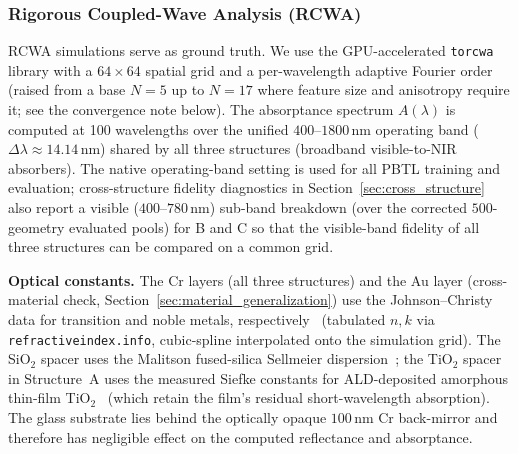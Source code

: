 \documentclass[a4paper,fleqn]{cas-sc}
\begin{document}
\subsubsection{Rigorous Coupled-Wave Analysis (RCWA)}
\label{sec:rcwa_methods}

RCWA simulations serve as ground truth. We use the GPU-accelerated \texttt{torcwa} library with a $64 \times 64$ spatial grid and a per-wavelength adaptive Fourier order (raised from a base $N=5$ up to $N=17$ where feature size and anisotropy require it; see the convergence note below). The absorptance spectrum $A(\lambda)$ is computed at 100 wavelengths over the unified $400$--$1800$\,nm operating band ($\Delta\lambda \approx 14.14$\,nm) shared by all three structures (broadband visible-to-NIR absorbers). The native operating-band setting is used for all PBTL training and evaluation; cross-structure fidelity diagnostics in Section~\ref{sec:cross_structure} also report a visible ($400$--$780$\,nm) sub-band breakdown (over the corrected $500$-geometry evaluated pools) for B and C so that the visible-band fidelity of all three structures can be compared on a common grid.

\textbf{Optical constants.} The Cr layers (all three structures) and the Au layer (cross-material check, Section~\ref{sec:material_generalization}) use the Johnson--Christy data for transition and noble metals, respectively~\cite{johnson1974transition,johnson1972optical} (tabulated $n,k$ via \texttt{refractiveindex.info}, cubic-spline interpolated onto the simulation grid). The SiO$_2$ spacer uses the Malitson fused-silica Sellmeier dispersion~\cite{malitson1965}; the TiO$_2$ spacer in Structure~A uses the measured Siefke constants for ALD-deposited amorphous thin-film TiO$_2$~\cite{siefke2016} (which retain the film's residual short-wavelength absorption). The glass substrate lies behind the optically opaque $100$\,nm Cr back-mirror and therefore has negligible effect on the computed reflectance and absorptance.
\end{document}

